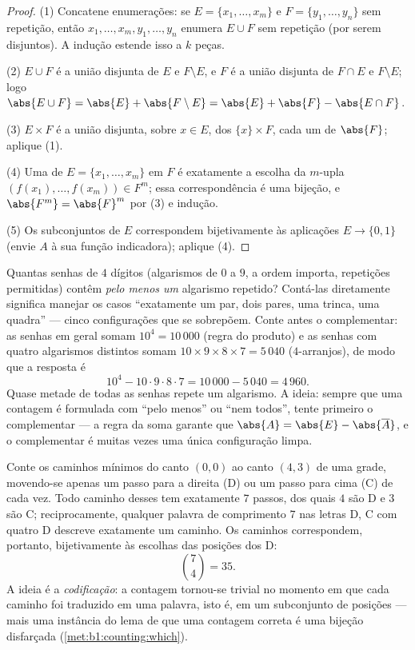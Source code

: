 \begin{proof}
(1) Concatene enumerações: se $E = \{x_1, \dots, x_m\}$ e $F =
\{y_1, \dots, y_n\}$ sem repetição, então $x_1, \dots, x_m, y_1,
\dots, y_n$ enumera $E \cup F$ sem repetição (por serem disjuntos).
A indução estende isso a $k$ peças.

(2) $E \cup F$ é a união disjunta de $E$ e $F \setminus E$, e
$F$ é a união disjunta de $F \cap E$ e $F \setminus E$; logo
$\abs{E \cup F} = \abs{E} + \abs{F \setminus E} = \abs{E} + \abs{F} -
\abs{E \cap F}$.

(3) $E \times F$ é a união disjunta, sobre $x \in E$, dos 
$\{x\} \times F$, cada um de  $\abs{F}$; aplique (1).

(4) Uma  de $E = \{x_1, \dots, x_m\}$ em $F$ é exatamente a escolha
da $m$-upla $(f(x_1), \dots, f(x_m)) \in F^m$; essa
correspondência é uma bijeção, e $\abs{F^m} = \abs{F}^m$ por (3) e
indução.

(5) Os subconjuntos de $E$ correspondem bijetivamente às aplicações $E \to \{0, 1\}$
(envie $A$ à sua função indicadora); aplique (4).
\end{proof}

\begin{example}\label{ex:b1:counting:complement}
Quantas senhas de $4$ dígitos (algarismos de $0$ a $9$, a ordem importa,
repetições permitidas) contêm \emph{pelo menos um} algarismo repetido?
Contá-las diretamente significa manejar os casos ``exatamente um par,
dois pares, uma trinca, uma quadra'' --- cinco configurações que se
sobrepõem. Conte antes o complementar: as senhas em geral somam
$10^4 = 10\,000$ (regra do produto) e as senhas com quatro algarismos
distintos somam $10 \times 9 \times 8 \times 7 = 5\,040$
($4$-arranjos), de modo que a resposta é
\[
10^4 - 10 \cdot 9 \cdot 8 \cdot 7 = 10\,000 - 5\,040 = 4\,960 .
\]
Quase metade de todas as senhas repete um algarismo. A ideia: sempre que
uma contagem é formulada com ``pelo menos'' ou ``nem todos'', tente
primeiro o complementar --- a regra da soma garante que
$\abs{A} = \abs{E} - \abs{\overline A}$, e o complementar é
muitas vezes uma única configuração limpa.
\end{example}

\begin{example}\label{ex:b1:counting:paths}
Conte os caminhos mínimos do canto $(0,0)$ ao canto
$(4, 3)$ de uma grade, movendo-se apenas um passo para a direita (D) ou
um passo para cima (C) de cada vez. Todo caminho desses tem exatamente
$7$ passos, dos quais $4$ são D e $3$ são C; reciprocamente, qualquer
palavra de comprimento $7$ nas letras D, C com quatro D descreve
exatamente um caminho. Os caminhos correspondem, portanto, bijetivamente
às escolhas das posições dos D:
\[
\binom{7}{4} = 35 .
\]
A ideia é a \emph{codificação}: a contagem tornou-se trivial no
momento em que cada caminho foi traduzido em uma palavra, isto é, em um
subconjunto de posições --- mais uma instância do lema de que uma
contagem correta é uma bijeção disfarçada (\cref{met:b1:counting:which}).
\end{example}

